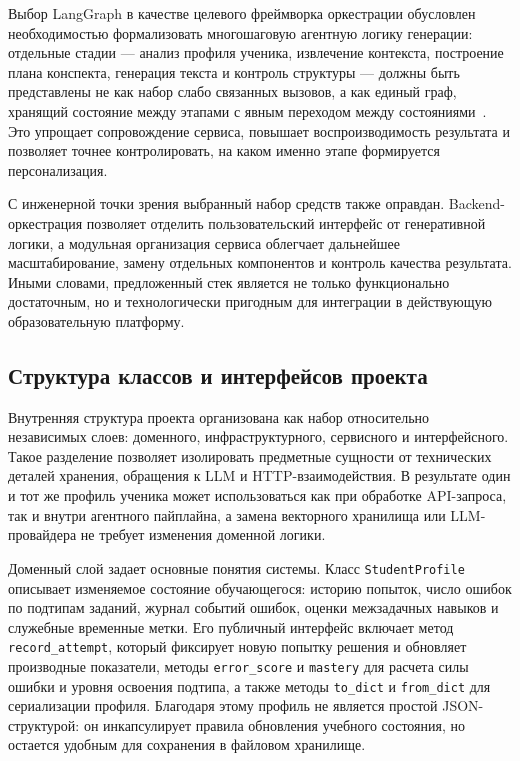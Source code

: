 \documentclass[a4paper,12pt]{extarticle}
\begin{document}
Выбор LangGraph в качестве целевого фреймворка оркестрации обусловлен необходимостью 
формализовать многошаговую агентную логику
генерации: отдельные стадии --- анализ профиля ученика, извлечение
контекста, построение плана конспекта, генерация текста и контроль структуры --- должны быть представлены
не как набор слабо связанных вызовов, а как единый граф, хранящий состояние между этапами с явным переходом между
состояниями~\cite{langchain2024}.
Это упрощает сопровождение сервиса, повышает
воспроизводимость результата и позволяет точнее контролировать, на каком именно этапе
формируется персонализация.

С инженерной точки зрения выбранный набор средств также оправдан. Backend-оркестрация 
позволяет отделить пользовательский интерфейс от генеративной логики, 
а модульная организация сервиса облегчает дальнейшее масштабирование, 
замену отдельных компонентов и контроль качества результата. 
Иными словами, предложенный стек является не только функционально достаточным, 
но и технологически пригодным для интеграции в действующую образовательную платформу.

\subsection{Структура классов и интерфейсов проекта}

Внутренняя структура проекта организована как набор относительно независимых слоев:
доменного, инфраструктурного, сервисного и интерфейсного. Такое разделение позволяет
изолировать предметные сущности от технических деталей хранения, обращения к LLM и
HTTP-взаимодействия. В результате один и тот же профиль ученика может использоваться
как при обработке API-запроса, так и внутри агентного пайплайна, а замена векторного
хранилища или LLM-провайдера не требует изменения доменной логики.

Доменный слой задает основные понятия системы. Класс 
\texttt{StudentProfile} описывает
изменяемое состояние обучающегося: историю попыток, число ошибок по подтипам заданий,
журнал событий ошибок, оценки межзадачных навыков и служебные временные метки. Его
публичный интерфейс включает метод \texttt{record\_attempt}, который фиксирует новую
попытку решения и обновляет производные показатели, методы \texttt{error\_score} и
\texttt{mastery} для расчета силы ошибки и уровня освоения подтипа, а также методы
\texttt{to\_dict} и \texttt{from\_dict} для сериализации профиля. Благодаря этому
профиль не является простой JSON-структурой: он инкапсулирует правила обновления
учебного состояния, но остается удобным для сохранения в файловом хранилище.
\end{document}
